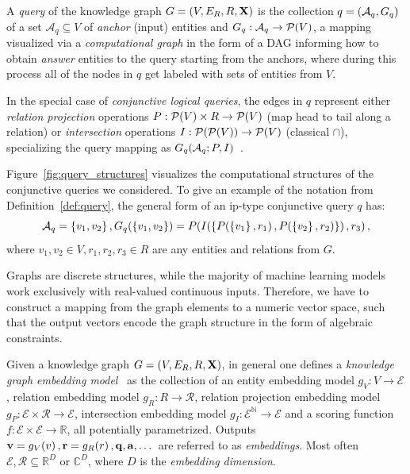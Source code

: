 \begin{definition}
    A \emph{query} of the knowledge graph $G=\mathopen{}\left(V, E_R, R, \mathbf{X}\right)$ is the collection $q=\mathopen{}\left(\mathcal{A}_q, G_q\right)$ of a set $\mathcal{A}_q \subseteq V$ of \emph{anchor} (input) entities and $G_q: \mathcal{A}_q \to \mathcal{P}\mathopen{}\left(V\right)$, a mapping visualized via a \emph{computational graph} in the form of a DAG informing how to obtain \emph{answer} entities to the query starting from the anchors, where during this process all of the nodes in $q$ get labeled with sets of entities from $V$. 
    
    In the special case of \emph{conjunctive logical queries}, the edges in $q$ represent either \emph{relation projection} operations $P: \mathcal{P}\mathopen{}\left(V\right) \times R \to \mathcal{P}\mathopen{}\left(V\right)$ (map head to tail along a relation) or \emph{intersection} operations $I: \mathcal{P}\mathopen{}\left(\mathcal{P}\mathopen{}\left(V\right)\right) \to \mathcal{P}\mathopen{}\left(V\right)$ (classical $\cap$), specializing the query mapping as $G_q\mathopen{}\left(\mathcal{A}_q;P,I\right)$~\cite{ren_query2box_2020}.
    \label{def:query}
\end{definition}
Figure~\ref{fig:query_structures} visualizes the computational structures of the conjunctive queries we considered. To give an example of the notation from Definition~\ref{def:query}, the general form of an ip-type conjunctive query $q$ has: $$\mathcal{A}_q=\mathopen{}\left\{v_1,v_2\right\}, G_q\mathopen{}\left(\mathopen{}\left\{v_1,v_2\right\}\right)=P\mathopen{}\left(I\mathopen{}\left(\mathopen{}\left\{P\mathopen{}\left(\mathopen{}\left\{v_1\right\},r_1\right),P\mathopen{}\left(\mathopen{}\left\{v_2\right\},r_2\right)\right\}\right),r_3\right),$$
where $v_1,v_2 \in V, r_1,r_2,r_3 \in R$ are any entities and relations from $G$.

Graphs are discrete structures, while the majority of machine learning models work exclusively with real-valued continuous inputs. Therefore, we have to construct a mapping from the graph elements to a numeric vector space, such that the output vectors encode the graph structure in the form of algebraic constraints.
\begin{definition}
Given a knowledge graph $G = \mathopen{}\left(V, E_R, R, \mathbf{X}\right)$, in general one defines a \textit{knowledge graph embedding model}~\cite{ji_survey_2022,liang_survey_2024,ren_query2box_2020} as the collection of an entity embedding model $g_V: V \to \mathcal{E}$, relation embedding model $g_R: R \to \mathcal{R}$, relation projection embedding model $g_P: \mathcal{E} \times \mathcal{R} \to \mathcal{E}$, intersection embedding model $g_I: \mathcal{\mathcal{E}}^{\mathbb{N}} \to \mathcal{E}$ and a scoring function $f: \mathcal{E} \times \mathcal{E} \to \mathbb{R}$, all potentially parametrized. Outputs $\mathbf{v} = g_V\mathopen{}\left(v\right), \mathbf{r} = g_R\mathopen{}\left(r\right), \mathbf{q}, \mathbf{a}, \dots$ are referred to as \emph{embeddings}. Most often $\mathcal{E}, \mathcal{R} \subseteq \mathbb{R}^D$ or $\mathbb{C}^D$, where $D$ is the \emph{embedding dimension}. 
\end{definition}

